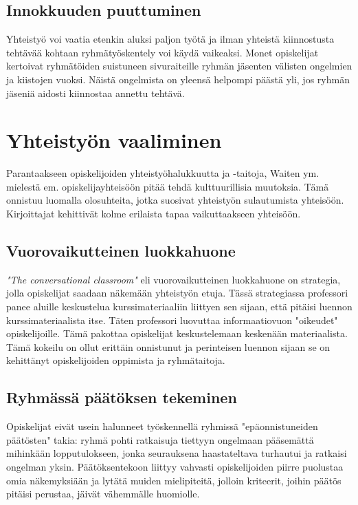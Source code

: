 \documentclass[finnish]{article}
\begin{document}
\subsection{Innokkuuden puuttuminen}

Yhteistyö voi vaatia etenkin aluksi paljon työtä ja ilman yhteistä kiinnostusta tehtävää kohtaan ryhmätyöskentely voi käydä vaikeaksi. Monet opiskelijat kertoivat ryhmätöiden suistuneen sivuraiteille ryhmän jäsenten välisten ongelmien ja kiistojen vuoksi. Näistä ongelmista on yleensä helpompi päästä yli, jos ryhmän jäseniä aidosti kiinnostaa annettu tehtävä.

\section{Yhteistyön vaaliminen}

Parantaakseen opiskelijoiden yhteistyöhalukkuutta ja -taitoja, Waiten ym. mielestä em. opiskelijayhteisöön pitää tehdä kulttuurillisia muutoksia. Tämä onnistuu luomalla olosuhteita, jotka suosivat yhteistyön sulautumista yhteisöön. Kirjoittajat kehittivät kolme erilaista tapaa vaikuttaakseen yhteisöön.

\subsection{Vuorovaikutteinen luokkahuone}

\emph{"The conversational classroom"} eli vuorovaikutteinen luokkahuone  on strategia, jolla opiskelijat saadaan näkemään yhteistyön etuja. Tässä strategiassa professori panee aluille keskustelua kurssimateriaaliin liittyen sen sijaan, että pitäisi luennon kurssimateriaalista itse. Täten professori luovuttaa informaatiovuon "oikeudet" opiskelijoille. Tämä pakottaa opiskelijat keskustelemaan keskenään materiaalista. Tämä kokeilu on ollut erittäin onnistunut ja perinteisen luennon sijaan se on kehittänyt opiskelijoiden oppimista ja ryhmätaitoja.

\subsection{Ryhmässä päätöksen tekeminen}

Opiskelijat eivät usein halunneet työskennellä ryhmissä "epäonnistuneiden päätösten" takia: ryhmä pohti ratkaisuja tiettyyn ongelmaan pääsemättä mihinkään lopputulokseen, jonka seurauksena haastateltava turhautui ja ratkaisi ongelman yksin. Päätöksentekoon liittyy vahvasti opiskelijoiden piirre puolustaa omia näkemyksiään ja lytätä muiden mielipiteitä, jolloin kriteerit, joihin päätös pitäisi perustaa, jäivät vähemmälle huomiolle.\\
\end{document}
